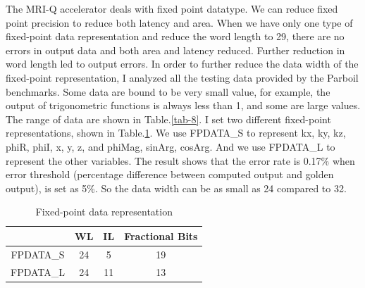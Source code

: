 The MRI-Q accelerator deals with fixed point datatype. We can reduce fixed point
precision to reduce both latency and area. When we have only one type of
fixed-point data representation and reduce the word length to 29, there are no
errors in output data and both area and latency reduced. Further reduction in
word length led to output errors. In order to further reduce the data width of
the fixed-point representation, I analyzed all the testing data provided by the
Parboil benchmarks. Some data are bound to be very small value, for
example, the output of trigonometric functions is always less than 1, and some
are large values. The range of data are shown in Table.\ref{tab-8}. I set two
different fixed-point representations, shown in Table.\ref{tab-4}. We use
FPDATA\_S to represent kx, ky, kz, phiR, phiI, x, y, z, and phiMag, sinArg,
cosArg. And we use FPDATA\_L to represent the other variables. The result shows
that the error rate is 0.17\% when error threshold (percentage difference
between computed output and golden output), is set as 5\%. So the data width can
be as small as 24 compared to 32. \\

\begin{table}[h!]
    \centering
    \begin{tabular}{c|c|c|c}
    \hline
        & WL & IL & Fractional Bits \\
        \hline
   FPDATA\_S &  24  & 5  & 19 \\ 
FPDATA\_L &  24 & 11   & 13\\
    \hline
    \end{tabular}
    \caption{Fixed-point data representation}
    \label{tab-4}
\end{table}

